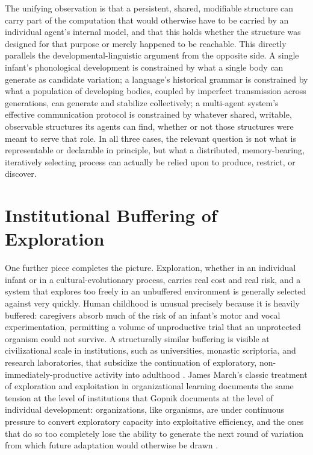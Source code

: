 \documentclass[11pt]{article}
\begin{document}
The unifying observation is that a persistent, shared, modifiable structure can carry part of the computation that would otherwise have to be carried by an individual agent's internal model, and that this holds whether the structure was designed for that purpose or merely happened to be reachable. This directly parallels the developmental-linguistic argument from the opposite side. A single infant's phonological development is constrained by what a single body can generate as candidate variation; a language's historical grammar is constrained by what a population of developing bodies, coupled by imperfect transmission across generations, can generate and stabilize collectively; a multi-agent system's effective communication protocol is constrained by whatever shared, writable, observable structures its agents can find, whether or not those structures were meant to serve that role. In all three cases, the relevant question is not what is representable or declarable in principle, but what a distributed, memory-bearing, iteratively selecting process can actually be relied upon to produce, restrict, or discover.

\section{Institutional Buffering of Exploration}

One further piece completes the picture. Exploration, whether in an individual infant or in a cultural-evolutionary process, carries real cost and real risk, and a system that explores too freely in an unbuffered environment is generally selected against very quickly. Human childhood is unusual precisely because it is heavily buffered: caregivers absorb much of the risk of an infant's motor and vocal experimentation, permitting a volume of unproductive trial that an unprotected organism could not survive. A structurally similar buffering is visible at civilizational scale in institutions, such as universities, monastic scriptoria, and research laboratories, that subsidize the continuation of exploratory, non-immediately-productive activity into adulthood \citep{hrdy2009,gould1977,simon1996,march1991}. James March's classic treatment of exploration and exploitation in organizational learning documents the same tension at the level of institutions that Gopnik documents at the level of individual development: organizations, like organisms, are under continuous pressure to convert exploratory capacity into exploitative efficiency, and the ones that do so too completely lose the ability to generate the next round of variation from which future adaptation would otherwise be drawn \citep{march1991}.
\end{document}
